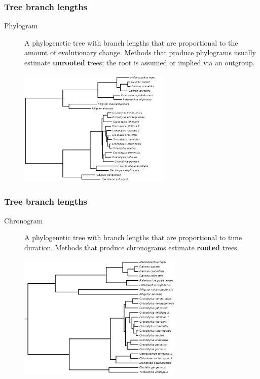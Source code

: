 \begin{frame}
    \frametitle{Tree branch lengths}
    \vspace{-0.25cm}
    \begin{description}
        \item[Phylogram] {\small A phylogenetic tree with branch lengths that are
            proportional to the amount of evolutionary change.  Methods that
            produce phylograms usually estimate \textbf{unrooted} trees; the
        root is assumed or implied via an outgroup.}
    \end{description}
    \begin{figure}
        \begin{center}
            \includegraphics[width=0.65\textwidth]{../images/crocodylia-ml.pdf}
        \end{center}
    \end{figure}
\end{frame}

\begin{frame}
    \frametitle{Tree branch lengths}
    \vspace{-0.25cm}
    \begin{description}
        \item[Chronogram] A phylogenetic tree with branch lengths that are
            proportional to time duration. Methods that produce chronograms
            estimate \textbf{rooted} trees.
    \end{description}
    \begin{figure}
        \begin{center}
            \includegraphics[width=0.7\textwidth]{../images/crocodylia-species-tree-square.pdf}
        \end{center}
    \end{figure}
\end{frame}

